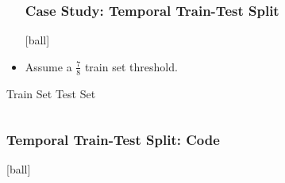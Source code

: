 \documentclass{beamer}
\begin{document}
\begin{frame}[fragile]
\begin{itemize}
\frametitle{Case Study: Temporal Train-Test Split}
[ball]

\item Assume a $\frac{7}{8}$ train set threshold. \\ 
\end{itemize}

\vspace{0.5cm}

\hspace{2cm} Train Set \hspace{4.5cm} Test Set \\ \vspace{0.2cm}

\begin{columns}
\hspace{1cm}
\begin{column}{0.5\textwidth}
\begin{minipage}[c]{1\textwidth}
    
\end{minipage}
\end{column}
\hspace{2cm}
\begin{column}{0.6\textwidth}
\begin{minipage}[c]{0.5\textwidth}
    
\end{minipage}
\end{column}
\end{columns}

\end{frame}


\begin{frame}[fragile]
\frametitle{Temporal Train-Test Split: Code}
[ball]



\end{frame}

\end{document}
